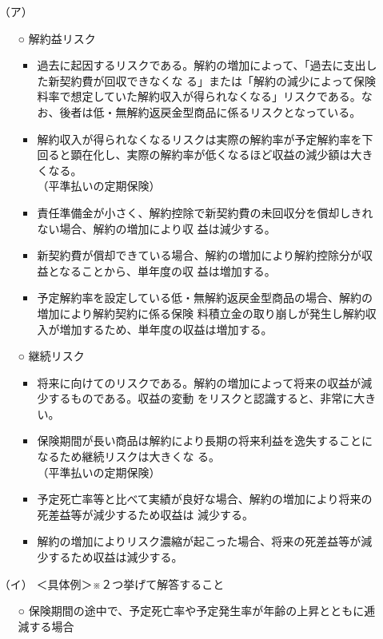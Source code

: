 \documentclass[report,gutter=10mm,fore-edge=10mm,uplatex,dvipdfmx]{jlreq}
\begin{document}
\begin{itemize}
 \item [（ア）]
 \begin{itemize}
  \item  [○]解約益リスク
\begin{itemize}
 \item 過去に起因するリスクである。解約の増加によって、「過去に支出した新契約費が回収できなくな
  る」または「解約の減少によって保険料率で想定していた解約収入が得られなくなる」リスクである。なお、後者は低・無解約返戻金型商品に係るリスクとなっている。
 \item 解約収入が得られなくなるリスクは実際の解約率が予定解約率を下回ると顕在化し、実際の解約率が低くなるほど収益の減少額は大きくなる。\\
  （平準払いの定期保険）\\
 \item 責任準備金が小さく、解約控除で新契約費の未回収分を償却しきれない場合、解約の増加により収  益は減少する。
 \item 新契約費が償却できている場合、解約の増加により解約控除分が収益となることから、単年度の収  益は増加する。
 \item 予定解約率を設定している低・無解約返戻金型商品の場合、解約の増加により解約契約に係る保険  料積立金の取り崩しが発生し解約収入が増加するため、単年度の収益は増加する。
\end{itemize}  
  \item [○]継続リスク
\begin{itemize}
 \item 将来に向けてのリスクである。解約の増加によって将来の収益が減少するものである。収益の変動  をリスクと認識すると、非常に大きい。
 \item 保険期間が長い商品は解約により長期の将来利益を逸失することになるため継続リスクは大きくな  る。\\
  （平準払いの定期保険）\\
 \item 予定死亡率等と比べて実績が良好な場合、解約の増加により将来の死差益等が減少するため収益は  減少する。
 \item  解約の増加によりリスク濃縮が起こった場合、将来の死差益等が減少するため収益は減少する。
\end{itemize}
\end{itemize}
 \item [（イ）] ＜具体例＞※２つ挙げて解答すること
\begin{itemize}
 \item  [○]保険期間の途中で、予定死亡率や予定発生率が年齢の上昇とともに逓減する場合

\end{itemize}
\end{itemize}
\end{document}
